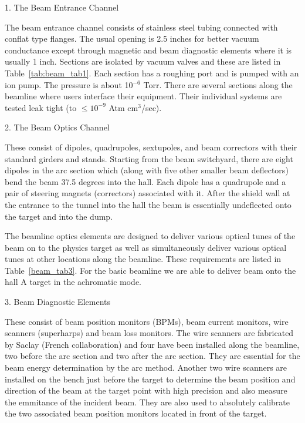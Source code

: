 \vskip 0.5cm
1. The Beam Entrance Channel

The beam entrance channel consists of stainless steel tubing connected with 
conflat type flanges. The usual opening is 2.5 inches for better vacuum 
conductance except through magnetic and beam diagnostic elements where it is 
usually 1 inch. Sections are isolated by vacuum valves and these are listed 
in Table~\ref{tab:beam_tab1}. Each section has a roughing port and is pumped with an ion pump. 
The pressure is about 10$^{-6}$ Torr. There are several sections along the 
beamline where users interface their equipment. Their individual systems 
are tested leak tight (to $ \le 10^{-9}$ Atm cm$^3$/sec).

\vskip 0.5cm
2. The Beam Optics Channel

These consist of dipoles, quadrupoles, sextupoles, and 
beam correctors with their 
standard girders and stands. Starting from the beam switchyard, there are 
eight dipoles in the arc section which (along with five  other smaller beam 
deflectors) bend the beam 37.5 degrees into the hall. Each dipole has a 
quadrupole and a pair of steering magnets (correctors) associated with it. 
After the shield wall at the entrance to the tunnel into the hall the beam is 
essentially undeflected onto the target and into the dump.  

The beamline optics elements are designed to deliver 
various optical tunes of the beam on to the physics target as well as 
simultaneously deliver various optical tunes at other locations along the 
beamline. These requirements are listed in Table~\ref{beam_tab3}. For the basic beamline we 
are able to deliver beam onto the hall A target in the achromatic
mode. 
 
\vskip 0.5cm
3. Beam Diagnostic Elements

These consist of beam position monitors (BPMs), beam current monitors,  wire 
scanners (superharps) and beam loss monitors. 
The wire scanners are fabricated by Saclay (French 
collaboration) and four have been installed along the beamline, two before 
the arc section and two after the arc section. They are essential for the 
beam energy determination by the arc method. Another two wire scanners are
installed on the bench just before the target to determine the beam 
position and direction of the beam at the target point with high precision 
and also measure the emmitance of the incident beam. They are also used to  
absolutely calibrate the two associated beam position monitors located  in 
front of the target. 


